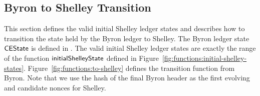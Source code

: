\clearpage

\subsection{Byron to Shelley Transition}
\label{sec:byron-to-shelley}

This section defines the valid initial Shelley ledger states and
describes how to transition the state held by the Byron ledger to Shelley.
The Byron ledger state $\mathsf{CEState}$ is defined in \cite{byron_chain_spec}.
The valid initial Shelley ledger states are exactly the range of
the function $\mathsf{initialShelleyState}$ defined in Figure~\ref{fig:functions:initial-shelley-states}.
Figure~\ref{fig:functions:to-shelley} defines the transition function from Byron.
Note that we use the hash of the final Byron header as the first evolving and
candidate nonces for Shelley.

